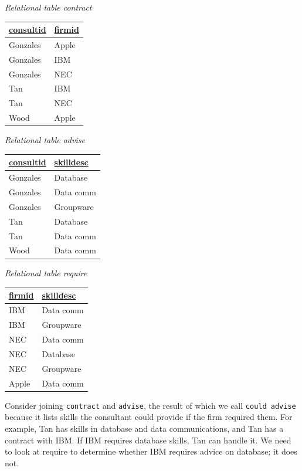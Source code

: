 \documentclass[
]{article}
\begin{document}
\emph{Relational table contract}

\begin{longtable}[]{@{}ll@{}}
\toprule
\underline{consultid} & \underline{firmid} \\
\midrule
\endhead
Gonzales & Apple \\
Gonzales & IBM \\
Gonzales & NEC \\
Tan & IBM \\
Tan & NEC \\
Wood & Apple \\
\bottomrule
\end{longtable}

\emph{Relational table advise}

\begin{longtable}[]{@{}ll@{}}
\toprule
\underline{consultid} & \underline{skilldesc} \\
\midrule
\endhead
Gonzales & Database \\
Gonzales & Data comm \\
Gonzales & Groupware \\
Tan & Database \\
Tan & Data comm \\
Wood & Data comm \\
\bottomrule
\end{longtable}

\emph{Relational table require}

\begin{longtable}[]{@{}ll@{}}
\toprule
\underline{firmid} & \underline{skilldesc} \\
\midrule
\endhead
IBM & Data comm \\
IBM & Groupware \\
NEC & Data comm \\
NEC & Database \\
NEC & Groupware \\
Apple & Data comm \\
\bottomrule
\end{longtable}

Consider joining \texttt{contract} and \texttt{advise}, the result of which we call
\texttt{could\ advise} because it lists skills the consultant could provide if
the firm required them. For example, Tan has skills in database and data
communications, and Tan has a contract with IBM. If IBM requires
database skills, Tan can handle it. We need to look at require to
determine whether IBM requires advice on database; it does not.
\end{document}
